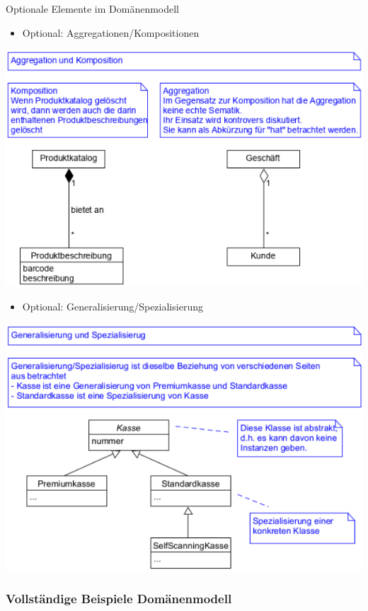 \begin{definition}{Optionale Elemente im Domänenmodell}
\begin{itemize}
    \item Optional: Aggregationen/Kompositionen
\end{itemize}
\includegraphics[width=\linewidth]{images/aggregation_komposition.png}
\begin{itemize}
    \item Optional: Generalisierung/Spezialisierung
\end{itemize}
\includegraphics[width=\linewidth]{images/gener_spez.png}
\end{definition}

\columnbreak

\subsubsection{Vollständige Beispiele Domänenmodell}


